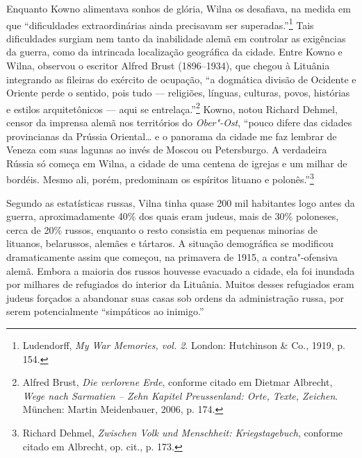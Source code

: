 Enquanto Kowno alimentava sonhos de glória, Wilna os desafiava, na
medida em que ``dificuldades extraordinárias ainda precisavam ser
superadas.''\footnote{Ludendorff, \emph{My War Memories, vol. 2}.
  London: Hutchinson \& Co., 1919, p. 154.} Tais dificuldades surgiam
nem tanto da inabilidade alemã em controlar as exigências da guerra,
como da intrincada localização geográfica da cidade. Entre Kowno e
Wilna, observou o escritor Alfred Brust (1896--1934), que chegou à
Lituânia integrando as fileiras do exército de ocupação, ``a dogmática
divisão de Ocidente e Oriente perde o sentido, pois tudo --- religiões,
línguas, culturas, povos, histórias e estilos arquitetônicos --- aqui se
entrelaça.''\footnote{Alfred Brust, \emph{Die verlorene Erde}, conforme
  citado em Dietmar Albrecht, \emph{Wege nach Sarmatien -- Zehn Kapitel
  Preussenland: Orte, Texte, Zeichen}. München: Martin Meidenbauer,
  2006, p. 174.} Kowno, notou Richard Dehmel, censor da imprensa alemã
nos territórios do \emph{Ober"-Ost}, ``pouco difere das cidades
provincianas da Prússia Oriental\ldots{} e o panorama da cidade me faz
lembrar de Veneza com suas lagunas ao invés de Moscou ou Petersburgo. A
verdadeira Rússia só começa em Wilna, a cidade de uma centena de igrejas
e um milhar de bordéis. Mesmo ali, porém, predominam os espíritos
lituano e polonês.''\footnote{Richard Dehmel, \emph{Zwischen Volk und
  Menschheit: Kriegstagebuch}, conforme citado em Albrecht, op. cit., p.
  173.}

Segundo as estatísticas russas, Vilna tinha quase 200 mil habitantes
logo antes da guerra, aproximadamente 40\% dos quais eram judeus, mais
de 30\% poloneses, cerca de 20\% russos, enquanto o resto consistia em
pequenas minorias de lituanos, belarussos, alemães e tártaros. A
situação demográfica se modificou dramaticamente assim que começou, na
primavera de 1915, a contra"-ofensiva alemã. Embora a maioria dos russos
houvesse evacuado a cidade, ela foi inundada por milhares de refugiados
do interior da Lituânia. Muitos desses refugiados eram judeus forçados a
abandonar suas casas sob ordens da administração russa, por serem
potencialmente ``simpáticos ao inimigo.''

